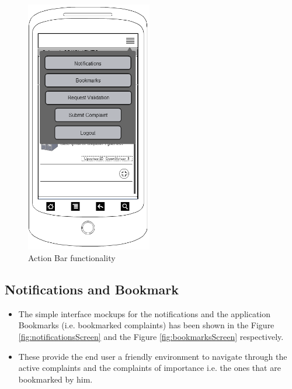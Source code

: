 \documentclass[12pt]{article}
\begin{document}
    \begin{figure}[H]
      \centering
    \includegraphics[width=5.5cm]{./appMockUp/actionBarNotificationScreen1} 
      \caption{Action Bar functionality}
        \label{fig:actionBarNotificationScreen1}
     \end{figure}
    
    
    

  
    \subsection{Notifications and Bookmark}
     \par 

    \begin{itemize} 
    \item The simple interface mockups for the notifications and the application Bookmarks (i.e. bookmarked complaints) has been shown in the Figure \ref{fig:notificationsScreen} and the Figure \ref{fig:bookmarksScreen} respectively.
    \item These provide the end user a friendly environment to navigate through the active complaints and the complaints of importance i.e. the ones that are bookmarked by him.
    \end{itemize}
    
\end{document}
